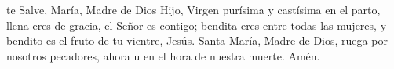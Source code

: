 te Salve, María, Madre de Dios Hijo, Virgen purísima y castísima en el parto, llena eres de gracia, el Señor es contigo; 
bendita eres entre todas las mujeres, y bendito es el fruto de tu vientre, Jesús. Santa María, Madre de Dios, ruega por nosotros pecadores,
ahora u en el hora de nuestra muerte. Amén.